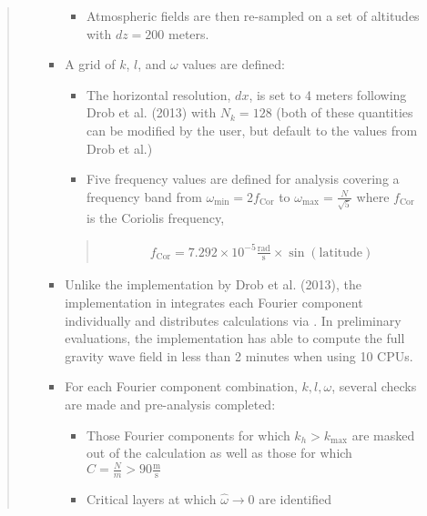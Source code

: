 \documentclass[letterpaper,10pt,english]{sphinxmanual}
\begin{document}
\begin{itemize}
\begin{quote}
\begin{itemize}
\begin{itemize}
\begin{itemize}
\item {} 
Atmospheric fields are then re-sampled on a set of altitudes with \(dz = 200\) meters.

\end{itemize}

\item {} 
A grid of \(k\), \(l\), and \(\omega\) values are defined:
\begin{itemize}
\item {} 
The horizontal resolution, \(dx\), is set to 4 meters following Drob et al. (2013) with \(N_k = 128\) (both of these quantities can be modified by the user, but default to the values from Drob et al.)

\item {} 
Five frequency values are defined for analysis covering a frequency band from \(\omega_\text{min} = 2 f_\text{Cor}\) to \(\omega_\text{max} = \frac{N}{\sqrt{5}}\) where \(f_\text{Cor}\) is the Coriolis frequency,

\end{itemize}
\begin{quote}
\begin{equation*}
\begin{split}f_\text{Cor} = 7.292 \times 10^{-5} \frac{\text{rad}}{\text{s}} \times \sin \left( \text{latitude} \right)\end{split}
\end{equation*}\end{quote}

\item {} 
Unlike the implementation by Drob et al. (2013), the implementation in  integrates each Fourier component individually and distributes calculations via .  In preliminary evaluations, the implementation has able to compute the full gravity wave field in less than 2 minutes when using 10 CPUs.

\item {} 
For each Fourier component combination, \(k, l, \omega\), several checks are made and pre-analysis completed:
\begin{itemize}
\item {} 
Those Fourier components for which \(k_h > k_\text{max}\) are masked out of the calculation as well as those for which \(C = \frac{N}{m} > 90 \frac{\text{m}}{\text{s}}\)

\item {} 
Critical layers at which \(\hat{\omega} \rightarrow 0\) are identified


\end{itemize}
\end{itemize}
\end{itemize}
\end{quote}
\end{itemize}
\end{document}
